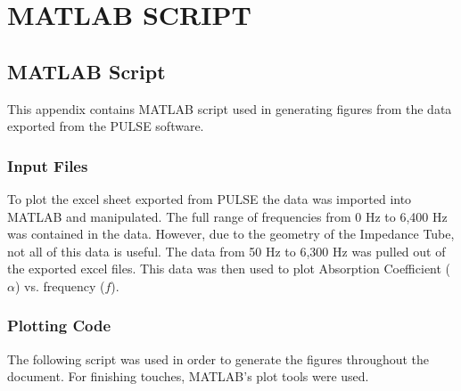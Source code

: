 \chapter{MATLAB SCRIPT}
\label{append-C}

\section{MATLAB Script}

This appendix contains MATLAB script used in generating figures from the data exported from the PULSE software.

\subsection{Input Files}

To plot the excel sheet exported from PULSE the data was imported into MATLAB and manipulated. The full range of frequencies from 0 Hz to 6,400 Hz was contained in the data. However, due to the geometry of the Impedance Tube, not all of this data is useful. The data from 50 Hz to 6,300 Hz was pulled out of the exported excel files. This data was then used to plot Absorption Coefficient ($\alpha$) vs. frequency ($f$).

\subsection{Plotting Code}

The following script was used in order to generate the figures throughout the document. For finishing touches, MATLAB's plot tools were used.

